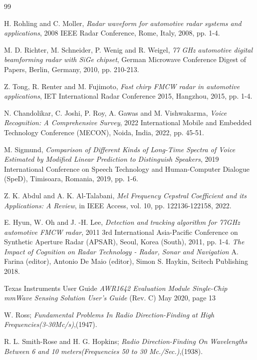 
\begin{thebibliography}{99} 
	
H. Rohling and C. Moller, 
{\em Radar waveform for automotive radar systems and applications}, 
2008 IEEE Radar Conference, Rome, Italy, 2008, pp. 1-4.

M. D. Richter, M. Schneider, P. Wenig and R. Weigel, 
{\em 77 GHz automotive digital beamforming radar with SiGe chipset},
German Microwave Conference Digest of Papers, Berlin, Germany, 2010, pp. 210-213.

Z. Tong, R. Renter and M. Fujimoto, 
{\em Fast chirp FMCW radar in automotive applications}, 
IET International Radar Conference 2015, Hangzhou, 2015, pp. 1-4.

N. Chandolikar, C. Joshi, P. Roy, A. Gawas and M. Vishwakarma, 
{\em Voice Recognition: A Comprehensive Survey}, 
2022 International Mobile and Embedded Technology Conference (MECON), 
Noida, India, 2022, pp. 45-51.

M. Sigmund, 
{\em Comparison of Different Kinds of Long-Time Spectra of Voice Estimated 
by Modified Linear Prediction to Distinguish Speakers}, 
2019 International Conference on Speech Technology and Human-Computer Dialogue (SpeD), 
Timisoara, Romania, 2019, pp. 1-6.

Z. K. Abdul and A. K. Al-Talabani, 
{\em Mel Frequency Cepstral Coefficient and its Applications: A Review}, 
in IEEE Access, vol. 10, pp. 122136-122158, 2022.

E. Hyun, W. Oh and J. -H. Lee, 
{\em Detection and tracking algorithm for 77GHz automotive FMCW radar}, 
2011 3rd International Asia-Pacific Conference on Synthetic Aperture Radar (APSAR), 
Seoul, Korea (South), 2011, pp. 1-4.
{\em The Impact of Cognition on Radar Technology - Radar, Sonar and Navigation}
A. Farina (editor), Antonio De Maio (editor), Simon S. Haykin, Scitech Publishing 2018.	

Texas Instruments User Guide
{\it AWR1642 Evaluation Module Single-Chip mmWave Sensing Solution User's Guide} (Rev. C) May 2020, page 13

W. Ross;
{\em Fundamental Problems In Radio Direction-Finding at High Frequencies(3-30Mc/s)},(1947).

R. L. Smith-Rose and H. G. Hopkins; 
{\em Radio Direction-Finding On Wavelengths Between 6 and 10 meters(Frequencies 50 to 30 Mc./Sec.)},(1938).



\end{thebibliography}
